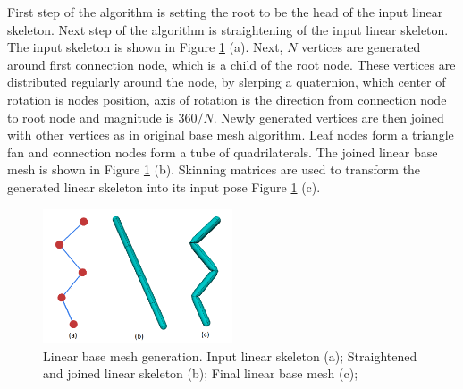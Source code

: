 First step of the algorithm is setting the root to be the head of the input linear skeleton.
Next step of the algorithm is straightening of the input linear skeleton.
The input skeleton is shown in Figure \ref{fig:worm_ilu} (a).
Next, $N$ vertices are generated around first connection node, which is a child of the root node.
These vertices are distributed regularly around the node, by slerping a quaternion, which center of rotation is nodes position, axis of rotation is the direction from connection node to root node and magnitude is $360/N$.
Newly generated vertices are then joined with other vertices as in original base mesh algorithm.
Leaf nodes form a triangle fan and connection nodes form a tube of quadrilaterals.
The joined linear base mesh is shown in Figure \ref{fig:worm_ilu} (b).
Skinning matrices are used to transform the generated linear skeleton into its input pose Figure \ref{fig:worm_ilu} (c).

\begin{figure}[ht]
    \centering
    \includegraphics[width=0.5\textwidth]{images/worm_generation}
    \caption[Linear base mesh]{Linear base mesh generation. Input linear skeleton (a); Straightened and joined linear skeleton (b); Final linear base mesh (c);}
    \label{fig:worm_ilu}
\end{figure}

